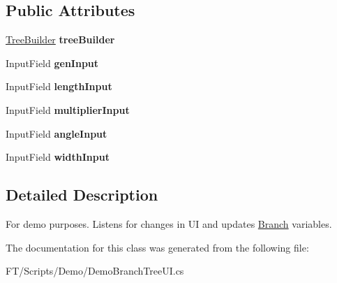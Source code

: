 \subsection*{Public Attributes}
\begin{DoxyCompactItemize}
\item 
\mbox{\label{class_fractal_tree_1_1_demo_1_1_demo_branch_tree_u_i_afdab251ab27e57fa924df3baea2d1640}} 
\hyperlink{class_fractal_tree_1_1_tree_builder}{Tree\+Builder} {\bfseries tree\+Builder}
\item 
\mbox{\label{class_fractal_tree_1_1_demo_1_1_demo_branch_tree_u_i_ab33f8bffbc27cc63893399be2ac52d7e}} 
Input\+Field {\bfseries gen\+Input}
\item 
\mbox{\label{class_fractal_tree_1_1_demo_1_1_demo_branch_tree_u_i_a315ec6a5eb1a262a36cf31f5490b5332}} 
Input\+Field {\bfseries length\+Input}
\item 
\mbox{\label{class_fractal_tree_1_1_demo_1_1_demo_branch_tree_u_i_a7f2ff774649678c09c958cc3e1d172f6}} 
Input\+Field {\bfseries multiplier\+Input}
\item 
\mbox{\label{class_fractal_tree_1_1_demo_1_1_demo_branch_tree_u_i_a034a4b9f32675cf9dd5241964f43db5b}} 
Input\+Field {\bfseries angle\+Input}
\item 
\mbox{\label{class_fractal_tree_1_1_demo_1_1_demo_branch_tree_u_i_a63ae8866b076ff0b3134c0159079180e}} 
Input\+Field {\bfseries width\+Input}
\end{DoxyCompactItemize}


\subsection{Detailed Description}
For demo purposes. Listens for changes in UI and updates \hyperlink{interface_fractal_tree_1_1_branch}{Branch} variables. 



The documentation for this class was generated from the following file\+:\begin{DoxyCompactItemize}
\item 
F\+T/\+Scripts/\+Demo/Demo\+Branch\+Tree\+U\+I.\+cs\end{DoxyCompactItemize}
